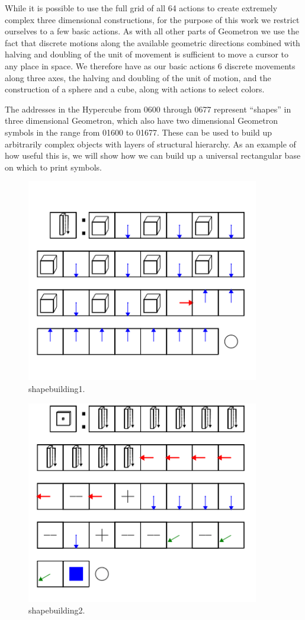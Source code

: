 While it is possible to use the full grid of all 64 actions to create extremely complex three dimensional constructions, for the purpose of this work we restrict ourselves to a few basic actions.  As with all other parts of Geometron we use the fact that discrete motions along the available geometric directions combined with halving and doubling of the unit of movement is sufficient to move a cursor to any place in space.  We therefore have as our basic actions 6 discrete movements along three axes, the halving and doubling of the unit of motion, and the construction of a sphere and a cube, along with actions to select colors. 

The addresses in the Hypercube from 0600 through 0677 represent ``shapes'' in three dimensional Geometron, which also have two dimensional Geometron symbols in the range from 01600 to 01677.  These can be used to build up arbitrarily complex objects with layers of structural hierarchy.  As an example of how useful this is, we will show how we can build up a universal rectangular base on which to print symbols.  


\begin{figure}
	\centering
	\includegraphics[width=4in]{figures/geometron3d/shapebuilding1.png}
	\caption[shapebuilding1]
	{shapebuilding1.}
\end{figure}

\begin{figure}
	\centering
	\includegraphics[width=4in]{figures/geometron3d/shapebuilding2.png}
	\caption[shapebuilding2]
	{shapebuilding2.}
\end{figure}


